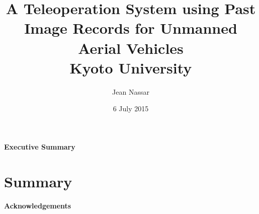 \title{
  {A Teleoperation System using Past Image Records for Unmanned Aerial Vehicles}\\
  {\large Kyoto University}
}
\author{Jean Nassar}
\date{6 July 2015}

\maketitle

\thispagestyle{empty}
  \null{}
    \begin{flushright}
    \end{flushright}
  \null

\newcommand\summaryname{Executive Summary}
\newenvironment{summary}%
  {\cleardoublepage\thispagestyle{empty}%
    \null\vfill%
    \begin{center}%
      \bfseries \summaryname
    \end{center}}%
  \vfill\null
  \begin{summary}
    \lipsum[1-3]
  \end{summary}
\chapter*{Summary}
\lipsum[1-3]

\newcommand\ackname{Acknowledgements}
\newenvironment{acknowledgements}%
  {\cleardoublepage\thispagestyle{empty}%
    \null\vfill%
    \begin{center}%
      \bfseries \ackname
    \end{center}}%
  \vfill\null
  \begin{acknowledgements}
    \lipsum[4-5]
  \end{acknowledgements}

\tableofcontents
\listoffigures
\listoftables


